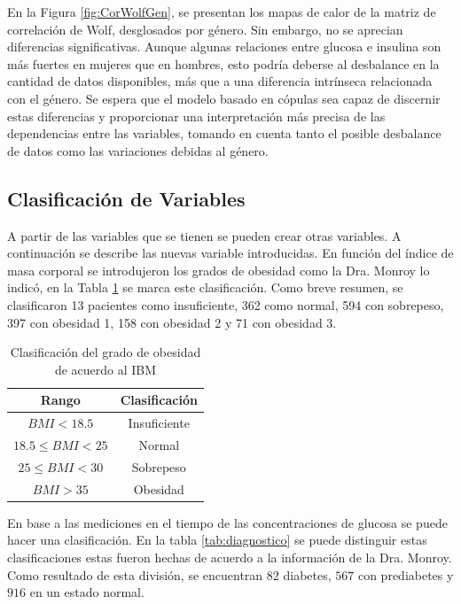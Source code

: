 En la Figura \ref{fig:CorWolfGen}, se presentan los mapas de calor de la matriz de correlación de Wolf, desglosados por género. Sin embargo, no se aprecian diferencias significativas. Aunque algunas relaciones entre glucosa e insulina son más fuertes en mujeres que en hombres, esto podría deberse al desbalance en la cantidad de datos disponibles, más que a una diferencia intrínseca relacionada con el género. Se espera que el modelo basado en cópulas sea capaz de discernir estas diferencias y proporcionar una interpretación más precisa de las dependencias entre las variables, tomando en cuenta tanto el posible desbalance de datos como las variaciones debidas al género.



 \subsection{Clasificación de Variables}

A partir de las variables que se tienen se pueden crear otras variables. A continuación se describe las nuevas variable introducidas.  En función del índice de masa corporal se introdujeron los grados de obesidad como la Dra. Monroy lo indicó, en la Tabla \ref{tab:clasBMI} se marca este clasificación.
Como breve resumen, se clasificaron 13 pacientes como insuficiente, 362 como normal, 594 con sobrepeso, 397 con obesidad 1, 158 con obesidad 2 y 71 con obesidad 3. 
 
\begin{table}[H]
    \centering
    \begin{tabular}{||c|c||}
    \hline\hline
    \textbf{Rango}                  & \textbf{Clasificación} \\ \hline\hline
    $BMI <  18.5$                   & Insuficiente           \\ \hline
    $18.5 \leq BMI < 25$            & Normal                 \\ \hline
    $25\leq BMI<30$                 & Sobrepeso              \\ \hline
    $ BMI > 35$               & Obesidad       \\ \hline\hline
\end{tabular}
\caption{Clasificación del grado de obesidad de acuerdo al IBM}
\label{tab:clasBMI}
\end{table}

En base a las mediciones en el tiempo de las concentraciones de glucosa se puede hacer una clasificación. En la tabla \ref{tab:diagnostico} se puede distinguir estas clasificaciones estas fueron hechas de acuerdo a la información de la Dra. Monroy. Como resultado de esta división, se encuentran $82$ diabetes, $567$ con prediabetes y $916$ en un estado normal.


